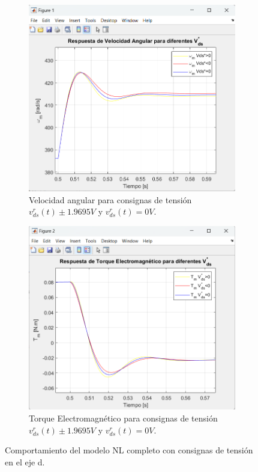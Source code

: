 \documentclass{article}
\begin{document}
\begin{figure}[H]
    \centering
    \begin{subfigure}[b]{0.5\textwidth}
        \centering
        \includegraphics[width=\textwidth]{Imagenes/VelocidadAngular_ConsignasTensionVds.png}
        \caption{Velocidad angular para consignas de tensión \(v^r_{ds}(t) \pm 1{.}9695V\) y \(v^r_{ds}(t) = 0V\).}
        \label{fig:VelocidadAngular_ConsignasTensionVds}
    \end{subfigure}
    \hfill
    \begin{subfigure}[b]{0.48\textwidth}
        \centering
        \includegraphics[width=\textwidth]{Imagenes/TorqueElectromagnetico_ConsignasTensionVds.png}
        \caption{Torque Electromagnético para consignas de tensión \(v^r_{ds}(t) \pm 1{.}9695V\) y \(v^r_{ds}(t) = 0V\).}
        \label{fig:TorqueElectromagnetico_ConsignasTensionVds}
    \end{subfigure}
    \caption{Comportamiento del modelo NL completo con consignas de tensión en el eje d.}
    \label{fig:ModeloNLcompletoConsignasTensionVds}
\end{figure}
\end{document}
